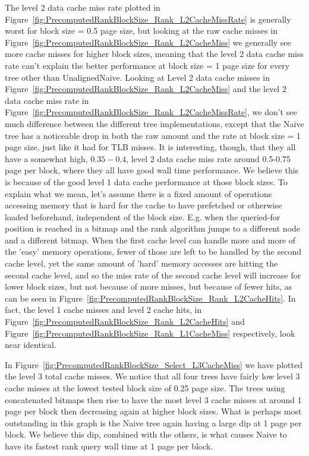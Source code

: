The level 2 data cache miss rate plotted in Figure~\ref{fig:PrecomputedRankBlockSize_Rank_L2CacheMissRate} is generally worst for block size = 0.5 page size, but looking at the raw cache misses in Figure~\ref{fig:PrecomputedRankBlockSize_Rank_L2CacheMiss} we generally see more cache misses for higher block sizes, meaning that the level 2 data cache miss rate can't explain the better performance at block size = 1 page size for every tree other than UnalignedNaive.
Looking at Level 2 data cache misses in Figure~\ref{fig:PrecomputedRankBlockSize_Rank_L2CacheMiss} and the level 2 data cache miss rate in Figure~\ref{fig:PrecomputedRankBlockSize_Rank_L2CacheMissRate}, we don't see much difference between the different tree implementations, except that the Naive tree has a noticeable drop in both the raw amount and the rate at block size = 1 page size, just like it had for TLB misses.
It is interesting, though, that they all have a somewhat high, $0.35-0.4$, level 2 data cache miss rate around 0.5-0.75 page per block, where they all have good wall time performance.
We believe this is because of the good level 1 data cache performance at those block sizes.
To explain what we mean, let's assume there is a fixed amount of operations accessing memory that is hard for the cache to have prefetched or otherwise loaded beforehand, independent of the block size.
E.g. when the queried-for position is reached in a bitmap and the rank algorithm jumps to a different node and a different bitmap.
When the first cache level can handle more and more of the 'easy' memory operations, fewer of those are left to be handled by the second cache level, yet the same amount of 'hard' memory accesses are hitting the second cache level, and so the miss rate of the second cache level will increase for lower block sizes, but not because of more misses, but because of fewer hits, as can be seen in Figure~\ref{fig:PrecomputedRankBlockSize_Rank_L2CacheHits}.
In fact, the level 1 cache misses and level 2 cache hits, in Figure~\ref{fig:PrecomputedRankBlockSize_Rank_L2CacheHits} and Figure~\ref{fig:PrecomputedRankBlockSize_Rank_L1CacheMiss} respectively, look near identical.

In Figure~\ref{fig:PrecomputedRankBlockSize_Select_L3CacheMiss} we have plotted the level 3 total cache misses.
We notice that all four trees have fairly low level 3 cache misses at the lowest tested block size of 0.25 page size.
The trees using concatenated bitmaps then rise to have the most level 3 cache misses at around 1 page per block then decreasing again at higher block sizes.
What is perhaps most outstanding in this graph is the Naive tree again having a large dip at 1 page per block.
We believe this dip, combined with the others, is what causes Naive to have its fastest rank query wall time at 1 page per block.


